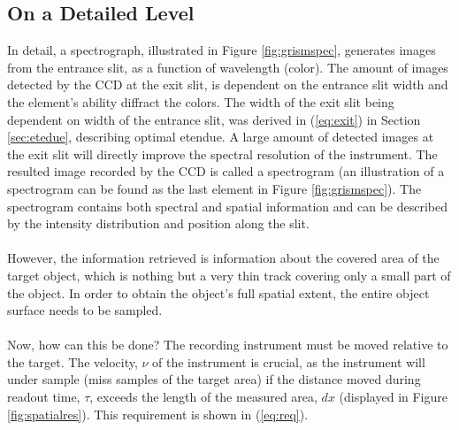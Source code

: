 \subsection{On a Detailed Level}
In detail, a spectrograph, illustrated in Figure \ref{fig:grismspec}, generates images from the entrance slit, as a function of wavelength (color). The amount of images detected by the CCD at the exit slit, is dependent on the entrance slit width and the element’s ability diffract the colors. The width of the exit slit being dependent on width of the entrance slit, was derived in (\ref{eq:exit}) in Section \ref{sec:etedue}, describing optimal etendue. A large amount of detected images at the exit slit will directly improve the spectral resolution of the instrument. The resulted image recorded by the CCD is called a spectrogram (an illustration of a spectrogram can be found as the last element in Figure \ref{fig:grismspec}). The spectrogram contains both spectral and spatial information and can be described by the intensity distribution and position along the slit. 
\\\\
However, the information retrieved is information about the covered area of the target object, which is nothing but a very thin track covering only a small part of the object. In order to obtain the object's full spatial extent, the entire object surface needs to be sampled. 
\\\\
Now, how can this be done? The recording instrument must be moved relative to the target. The velocity, $\nu$ of the instrument is crucial, as the instrument will under sample (miss samples of the target area) if the distance moved during readout time, $\tau$, exceeds the length of the measured area, $dx$ (displayed in Figure \ref{fig:spatialres}). This requirement is shown in (\ref{eq:req}).

